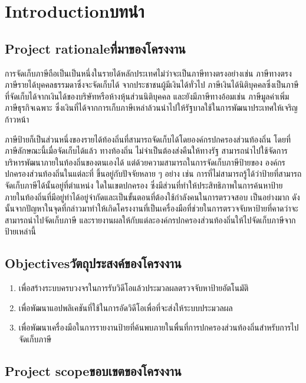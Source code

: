 \chapter{\ifenglish Introduction\else บทนำ\fi}

\section{\ifenglish Project rationale\else ที่มาของโครงงาน\fi}

การจัดเก็บภาษีถือเป็นเป็นหนึ่งในรายได้หลักประเทศไม่ว่าจะเป็นภาษีทางตรงอย่างเช่น ภาษีทางตรง ภาษีรายได้บุคคลธรรมดาซึ่งจะจัดเก็บได้
จากประชาชนผู้มีเงินได้ทั่วไป ภาษีเงินได้นิติบุคคลซึ่งเป็นภาษีที่จัดเก็บได้จากเงินได้ของบริษัทหรือห้างหุ้นส่วนนิติบุคคล และยังมีภาษีทางอ้อมเช่น 
ภาษีมูลค่าเพิ่ม ภาษีธุรกิจเฉพาะ ซึ่งเงินที่ได้จากการเก็บภาษีเหล่าล้วนนำไปให้รัฐบาลใช้ในการพัฒนาประเทศให้เจริญก้าวหน้า  

ภาษีป้ายก็เป็นส่วนหนึ่งของรายได้ท้องถิ่นที่สามารถจัดเก็บได้โดยองค์กรปกครองส่วนท้องถิ่น โดยที่ภาษีลักษณะนี้เมื่อจัดเก็บได้แล้ว ทางท้องถิ่น
ไม่จำเป็นต้องส่งคืนให้ทางรัฐ สามารถนำไปใช้จัดการบริหารพัฒนาภายในท้องถิ่นของตนเองได้ แต่ด้วยความสามารถในการจัดเก็บภาษีป้ายของ
องค์กรปกครองส่วนท้องถิ่นในแต่ละที่ ขึ้นอยู่กับปัจจัยหลาย ๆ อย่าง เช่น การที่ไม่สามารถรู้ได้ว่าป้ายที่สามารถจัดเก็บภาษีได้นั้นอยู่ที่ตำแหน่ง
ใดในเขตปกครอง ซึ่งมีส่วนที่ทำให้ประสิทธิภาพในการค้นหาป้ายภายในท้องถิ่นที่มีอยู่ทำได้อยู่จำกัดและเป็นขั้นตอนที่ต้องใช้กำลังคนในการตรวจสอบ
เป็นอย่างมาก ดังนั้นจากปัญหาในจุดที่กล่าวมาทำให้เกิดโครงงานที่เป็นเครื่องมือที่ช่วยในการตรวจจับหาป้ายที่คาดว่าจะสามารถนำไปจัดเก็บภาษี 
และรายงานผลให้กับแต่ละองค์กรปกครองส่วนท้องถิ่นให้ไปจัดเก็บภาษีจากป้ายเหล่านี้

\section{\ifenglish Objectives\else วัตถุประสงค์ของโครงงาน\fi}
\begin{enumerate}
    \item เพื่อสร้างระบบครบวงจรในการรับวิดีโอแล้วประมวลผลตรวจจับหาป้ายอัตโนมัติ
    \item เพื่อพัฒนาแอปพลิเคชันที่ใช้ในการอัดวิดีโอเพื่อที่จะส่งให้ระบบประมวลผล 
    \item เพื่อพัฒนาเครื่องมือในการรายงานป้ายที่ค้นพบภายในพื่นที่การปกครองส่วนท้องถิ่นสำหรับการไปจัดเก็บภาษี 
\end{enumerate}

\section{\ifenglish Project scope\else ขอบเขตของโครงงาน\fi}

